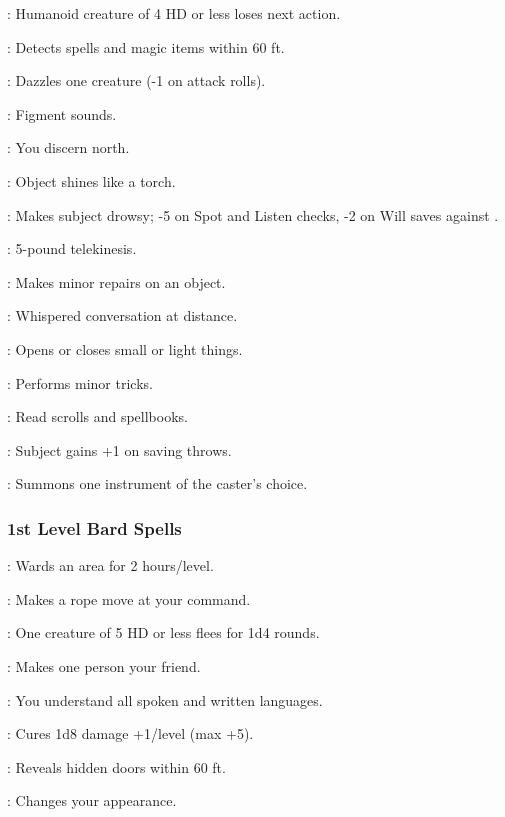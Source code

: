: Humanoid creature of 4 HD or less loses next action.

: Detects spells and magic items within 60 ft.

: Dazzles one creature (-1 on attack rolls).

: Figment sounds.

: You discern north.

: Object shines like a torch.

: Makes subject drowsy; -5 on Spot and Listen checks, -2 on Will saves against .

: 5-pound telekinesis.

: Makes minor repairs on an object.

: Whispered conversation at distance.

: Opens or closes small or light things.

: Performs minor tricks.

: Read scrolls and spellbooks.

: Subject gains +1 on saving throws.

: Summons one instrument of the caster's choice.

\subsubsection{1st Level Bard Spells}

: Wards an area for 2 hours/level.

: Makes a rope move at your command.

: One creature of 5 HD or less flees for 1d4 rounds.

: Makes one person your friend.

: You understand all spoken and written languages.

: Cures 1d8 damage +1/level (max +5).

: Reveals hidden doors within 60 ft.

: Changes your appearance.

